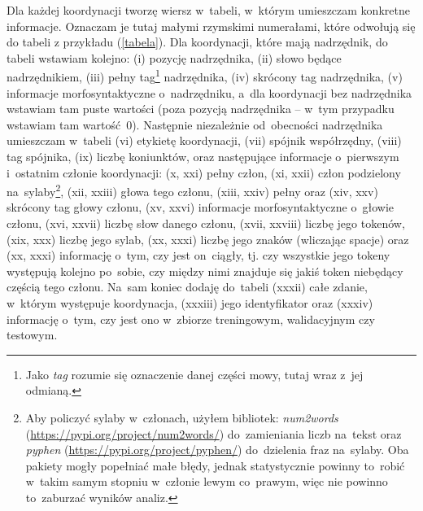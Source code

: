 \documentclass[licencjacka]{pracamgr_Kogni}
\begin{document}
    Dla każdej koordynacji tworzę wiersz w~tabeli, w~którym umieszczam konkretne informacje.
    Oznaczam je tutaj małymi rzymskimi numerałami, które odwołują się do tabeli z przykładu (\ref{tabela}).
    Dla koordynacji, które mają nadrzędnik, do tabeli wstawiam kolejno: (i) pozycję nadrzędnika, (ii) słowo będące nadrzędnikiem, (iii) pełny tag\footnote{Jako \textit{tag} rozumie się oznaczenie danej części mowy, tutaj wraz z~jej odmianą.} nadrzędnika, (iv) skrócony tag nadrzędnika, (v) informacje morfosyntaktyczne o~nadrzędniku, a~dla koordynacji bez nadrzędnika wstawiam tam puste wartości (poza pozycją nadrzędnika -- w~tym przypadku wstawiam tam wartość~0).
    Następnie niezależnie od~obecności nadrzędnika umieszczam w~tabeli (vi) etykietę koordynacji, (vii) spójnik współrzędny, (viii) tag spójnika, (ix) liczbę koniunktów, oraz następujące informacje o~pierwszym i~ostatnim członie koordynacji: (x, xxi) pełny człon, (xi, xxii) człon podzielony na~sylaby\footnote{Aby policzyć sylaby w~członach, użyłem bibliotek: \textit{num2words} (\url{https://pypi.org/project/num2words/}) do~zamieniania liczb na~tekst oraz \textit{pyphen} (\url{https://pypi.org/project/pyphen/}) do~dzielenia fraz na~sylaby. Oba pakiety mogły popełniać małe błędy, jednak statystycznie powinny to~robić w~takim samym stopniu w~członie lewym co~prawym, więc nie powinno to~zaburzać wyników analiz.}, (xii, xxiii) głowa tego członu, (xiii, xxiv) pełny oraz (xiv, xxv) skrócony tag głowy członu, (xv, xxvi) informacje morfosyntaktyczne o~głowie członu, (xvi, xxvii) liczbę słow danego członu, (xvii, xxviii) liczbę jego tokenów, (xix, xxx) liczbę jego sylab, (xx, xxxi) liczbę jego znaków (wliczając spacje) oraz (xx, xxxi) informację o~tym, czy jest on~ciągły, tj.
    czy wszystkie jego tokeny występują kolejno po~sobie, czy między nimi znajduje się jakiś token niebędący częścią tego członu.
    Na~sam koniec dodaję do~tabeli (xxxii) całe zdanie, w~którym występuje koordynacja, (xxxiii) jego identyfikator oraz (xxxiv) informację o~tym, czy jest ono w~zbiorze treningowym, walidacyjnym czy testowym.
\end{document}
